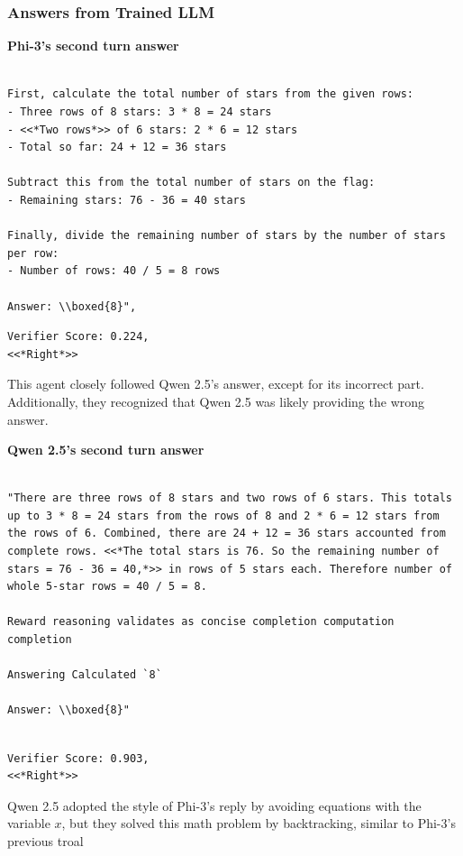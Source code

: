 \subsubsection{Answers from \oursspace Trained LLM}
\textbf{Phi-3's second turn answer }
\begin{lstlisting}[breaklines=true]

First, calculate the total number of stars from the given rows:
- Three rows of 8 stars: 3 * 8 = 24 stars
- <<*Two rows*>> of 6 stars: 2 * 6 = 12 stars
- Total so far: 24 + 12 = 36 stars

Subtract this from the total number of stars on the flag:
- Remaining stars: 76 - 36 = 40 stars

Finally, divide the remaining number of stars by the number of stars per row:
- Number of rows: 40 / 5 = 8 rows

Answer: \\boxed{8}",

\end{lstlisting}
\begin{lstlisting}
Verifier Score: 0.224,
<<*Right*>> 
\end{lstlisting}
This agent closely followed Qwen 2.5's answer, except for its incorrect part. Additionally, they recognized that Qwen 2.5 was likely providing the wrong answer.


\textbf{Qwen 2.5's second turn answer }
\begin{lstlisting}[breaklines=true]

"There are three rows of 8 stars and two rows of 6 stars. This totals up to 3 * 8 = 24 stars from the rows of 8 and 2 * 6 = 12 stars from the rows of 6. Combined, there are 24 + 12 = 36 stars accounted from complete rows. <<*The total stars is 76. So the remaining number of stars = 76 - 36 = 40,*>> in rows of 5 stars each. Therefore number of whole 5-star rows = 40 / 5 = 8.

Reward reasoning validates as concise completion computation completion

Answering Calculated `8`

Answer: \\boxed{8}"


\end{lstlisting}
\begin{lstlisting}
Verifier Score: 0.903,
<<*Right*>> 
\end{lstlisting}
Qwen 2.5 adopted the style of Phi-3's reply by avoiding equations with the variable $x$, but they solved this math problem by  backtracking, similar to Phi-3’s previous troal 



